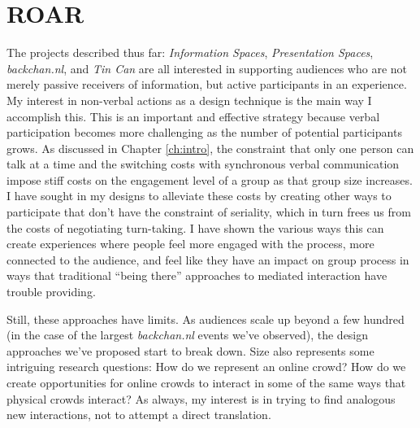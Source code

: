 \chapter{ROAR}
\label{ch:roar}


The projects described thus far: \emph{Information Spaces}, \emph{Presentation Spaces}, \emph{backchan.nl}, and \emph{Tin Can} are all interested in supporting audiences who are not merely passive receivers of information, but active participants in an experience. My interest in non-verbal actions as a design technique is the main way I accomplish this. This is an important and effective strategy because verbal participation becomes more challenging as the number of potential participants grows. As discussed in Chapter \ref{ch:intro}, the constraint that only one person can talk at a time and the switching costs with synchronous verbal communication impose stiff costs on the engagement level of a group as that group size increases. I have sought in my designs to alleviate these costs by creating other ways to participate that don't have the constraint of seriality, which in turn frees us from the costs of negotiating turn-taking. I have shown the various ways this can create experiences where people feel more engaged with the process, more connected to the audience, and feel like they have an impact on group process in ways that traditional ``being there'' approaches to mediated interaction have trouble providing. 


Still, these approaches have limits. As audiences scale up beyond a few hundred (in the case of the largest \emph{backchan.nl} events we've observed), the design approaches we've proposed start to break down. Size also represents some intriguing research questions: How do we represent an online crowd? How do we create opportunities for online crowds to interact in some of the same ways that physical crowds interact? As always, my interest is in trying to find analogous new interactions, not to attempt a direct translation.


